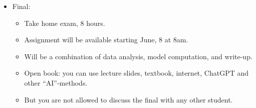 \documentclass[12pt]{article}
\begin{document}
\begin{itemize}
\begin{itemize}
	\end{itemize}
	\item Final:
	\begin{itemize}
		\item Take home exam, 8 hours.
		\item Assignment will be available starting June, 8 at 8am.
		\item Will be a combination of data analysis, model computation, and write-up.
		\item Open book: you can use lecture slides, textbook, internet, ChatGPT and other ``AI''-methods.
		\item But you are not allowed to discuss the final with any other student.
	\end{itemize}

\end{itemize}
\end{document}
